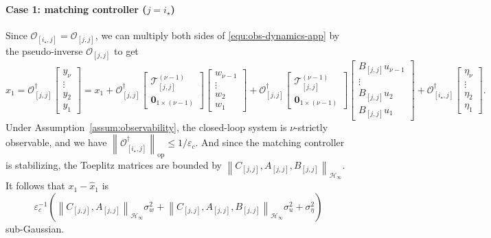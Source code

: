 \documentclass[11pt, twoside]{article}
\theoremstyle{definition}
\newcommand{\norm}[1]{\left\lVert #1 \right\rVert}
\newcommand{\tbo}[2]{\begin{bmatrix}#1 \\ #2\end{bmatrix}}
\newcommand{\opnorm}[1]{\norm{#1}_{\mathrm{op}}}
\newcommand{\hinfnorm}[1]{\norm{#1}_{\mathcal{H}_\infty}}
\begin{document}
\paragraph{Case 1: matching controller ($j = i_\star$)}
Since $\mathcal{O}_{[i_\star, j]} = \mathcal{O}_{[j,j]}$, we can multiply both sides of \eqref{equ:obs-dynamics-app} by the pseudo-inverse $\mathcal{O}_{[j,j]}$ to get
\begin{equation*}
\hat{x}_1 = \mathcal{O}_{[j, j]}^\dagger
\begin{bmatrix} y_\nu \\ \vdots \\y_2 \\ y_1 \end{bmatrix}
=
x_1
+
\mathcal{O}_{[j, j]}^\dagger
\tbo{\mathcal{T}^{(\nu-1)}_{[j, j]}}{\mathbf{0}_{1 \times (\nu-1)}}
\begin{bmatrix} w_{\nu-1} \\ \vdots \\w_2 \\ w_1  \end{bmatrix}
+
\mathcal{O}_{[j, j]}^\dagger
\tbo{\mathcal{T}^{(\nu-1)}_{[j, j]}}{\mathbf{0}_{1 \times (\nu-1)}}
\begin{bmatrix} B_{[j, j]}u_{\nu-1} \\ \vdots \\ B_{[j, j]}u_2 \\ B_{[j, j]}u_1  \end{bmatrix}
+
\mathcal{O}_{[i_\star, j]}^\dagger \begin{bmatrix} \eta_\nu \\ \vdots \\ \eta_2 \\ \eta_1  \end{bmatrix}.
\end{equation*}
Under Assumption~\ref{assum:observability}, the closed-loop system is $\nu$-strictly observable, and we have $\opnorm{\mathcal{O}_{[i_\star, j]}^\dagger} \le 1/\varepsilon_c$.
And since the matching controller is stabilizing, the Toeplitz matrices are bounded by $\hinfnorm{C_{[j,j]}, A_{[j,j]}, B_{[j,j]}}$.
It follows that $x_1 - \hat{x}_1$ is 
\begin{equation}
\label{equ:init-est-error}
    \varepsilon_c^{-1}\left(\hinfnorm{C_{[j,j]}, A_{[j,j]}}\sigma_w^2 + \hinfnorm{C_{[j,j]}, A_{[j,j]}, B_{[j,j]}}\sigma_u^2 + \sigma_\eta^2\right)
\end{equation}
sub-Gaussian.
\end{document}

